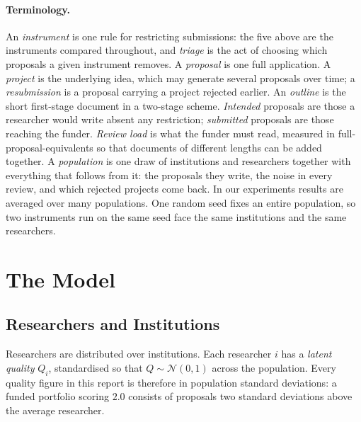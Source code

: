 \documentclass[11pt,a4paper]{article}
\begin{document}
\paragraph{Terminology.} An \emph{instrument} is one rule for restricting
submissions: the five above are the instruments compared throughout, and
\emph{triage} is the act of choosing which proposals a given instrument removes.
A \emph{proposal} is one full application. A \emph{project} is the underlying
idea, which may generate several proposals over time; a \emph{resubmission} is a
proposal carrying a project rejected earlier. An \emph{outline} is the short
first-stage document in a two-stage scheme. \emph{Intended} proposals are those a
researcher would write absent any restriction; \emph{submitted} proposals are
those reaching the funder. \emph{Review load} is what the funder must read,
measured in full-proposal-equivalents so that documents of different lengths can
be added together. A \emph{population} is one draw of institutions and
researchers together with everything that follows from it: the proposals they
write, the noise in every review, and which rejected projects come back. In our experiments results
are averaged over many populations.%
One random seed fixes an entire population, so two
instruments run on the same seed face the same institutions and the same
researchers.

\section{The Model}

\subsection{Researchers and Institutions}

Researchers are distributed over institutions. Each researcher $i$ has a
\emph{latent quality} $Q_i$, standardised so that $Q \sim \mathcal{N}(0,1)$
across the population. Every quality figure in this report is therefore in
population standard deviations: a funded portfolio scoring $2.0$ consists of
proposals two standard deviations above the average researcher.
\end{document}
